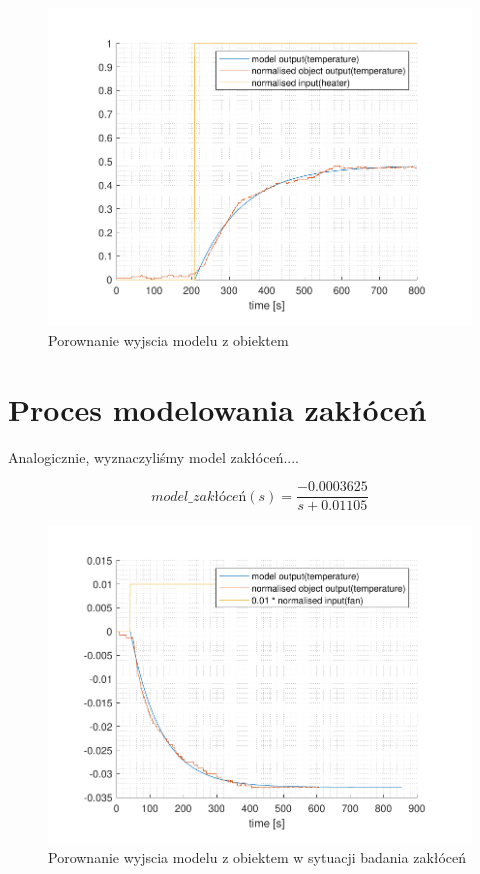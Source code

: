 \documentclass{mwrep}
\begin{document}
\begin{figure}[H]
\centering
\includegraphics[scale=0.8]{materialy/krystian_plots/wykresik_model_obiekt.pdf}
\caption{Porownanie wyjscia modelu z obiektem}
\end{figure}

\section{Proces modelowania zakłóceń}
\label{ModelowanieZaklocen}
Analogicznie, wyznaczyliśmy model zakłóceń....

\[model\_zakłóceń(s) = \frac{-0.0003625}{s + 0.01105}\]

\begin{figure}[H]
\centering
\includegraphics[scale=0.8]{materialy/krystian_plots/wykresik_zaklocenia.pdf}
\caption{Porownanie wyjscia modelu z obiektem w sytuacji badania zakłóceń}
\end{figure}
\end{document}

